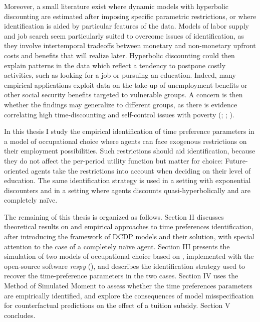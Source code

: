 Moreover, a small literature exist where dynamic models with hyperbolic discounting are estimated after imposing specific parametric restrictions, or where identification is aided by particular features of the data. Models of labor supply and job search seem particularly suited to overcome issues of identification, as they involve intertemporal tradeoffs between monetary and non-monetary upfront costs and benefits that will realize later. Hyperbolic discounting could then explain patterns in the data which reflect a tendency to postpone costly activities, such as looking for a job or pursuing an education. Indeed, many empirical applications exploit data on the take-up of unemployment benefits or other social security benefits targeted to vulnerable groups. A concern is then whether the findings may generalize to different groups, as there is evidence correlating high time-discounting and self-control issues with poverty (\cite{Lawrance1991}; \cite{BanerjeeMullainathan2010}; \cite{Bernheim2013}).


In this thesis I study the empirical identification of time preference parameters in a model of occupational choice where agents can face exogenous restrictions on their employment possibilities. Such restrictions should aid identification, because they do not affect the per-period utility function but matter for choice: Future-oriented agents take the restrictions into account when deciding on their level of education. The same identification strategy is used in a setting with exponential discounters and in a setting where agents discounts quasi-hyperbolically and are completely naïve.

The remaining of this thesis is organized as follows. Section II discusses theoretical results on and empirical approaches to time preferences identification, after introducing the framework of DCDP models and their solution, with special attention to the case of a completely naïve agent. Section III presents the simulation of two models of occupational choice based on \textcite{KeaneWolpin1994}, implemented with the open-source software \textit{respy} (\cite{GablerRaabe2020}), and describes the identification strategy used to recover the time-preference parameters in the two cases. Section IV uses the Method of Simulated Moment to assess whether the time preferences parameters are empirically identified, and explore the consequences of model misspecification for counterfactual predictions on the effect of a tuition subsidy. Section V concludes.

\vspace{1.5\baselineskip}